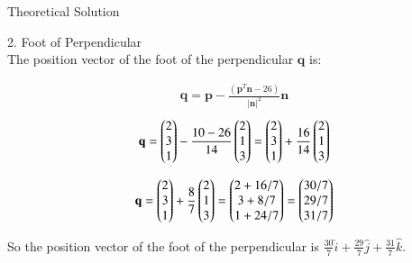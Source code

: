 \documentclass{beamer}
\begin{document}
\begin{frame}{Theoretical Solution}


2. Foot of Perpendicular\\

The position vector of the foot of the perpendicular    $\textbf{q}$ is:

\begin{align}
    \textbf{q} = \textbf{p} - \frac{(\textbf{p}^T \textbf{n} - 26)}{|\textbf{n}|^2} \textbf{n}
\end{align}
\begin{align}
  \textbf{q}  = \begin{pmatrix} 2 \\ 3 \\ 1 \end{pmatrix} - \frac{10 - 26}{14} \begin{pmatrix} 2 \\ 1 \\ 3 \end{pmatrix} = \begin{pmatrix} 2 \\ 3 \\ 1 \end{pmatrix} + \frac{16}{14} \begin{pmatrix} 2 \\ 1 \\ 3 \end{pmatrix}
\end{align}


\begin{align}
    \textbf{q} = \begin{pmatrix} 2 \\ 3 \\ 1 \end{pmatrix} + \frac{8}{7} \begin{pmatrix} 2 \\ 1 \\ 3 \end{pmatrix} = \begin{pmatrix} 2 + 16/7 \\ 3 + 8/7 \\ 1 + 24/7 \end{pmatrix} = \begin{pmatrix} 30/7 \\ 29/7 \\ 31/7 \end{pmatrix}
\end{align}


So the position vector of the foot of the perpendicular is $\frac{30}{7}\hat{i} + \frac{29}{7}\hat{j} + \frac{31}{7}\hat{k}$.






\end{frame}
\end{document}

